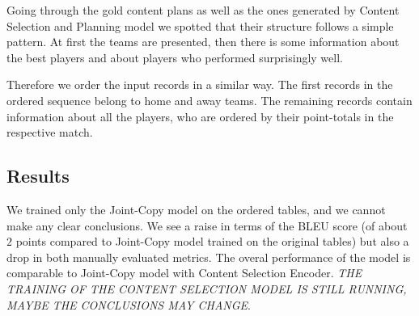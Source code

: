 Going through the gold content plans as well as the ones generated by Content Selection and Planning model we spotted that their structure follows a simple pattern. At first the teams are presented, then there is some information about the best players and about players who performed surprisingly well.

Therefore we order the input records in a similar way. The first records in the ordered sequence belong to home and away teams. The remaining records contain information about all the players, who are ordered by their point-totals in the respective match.

\subsection{Results}

We trained only the Joint-Copy model on the ordered tables, and we cannot make any clear conclusions. We see a raise in terms of the BLEU score (of about $2$ points compared to Joint-Copy model trained on the original tables) but also a drop in both manually evaluated metrics. The overal performance of the model is comparable to Joint-Copy model with Content Selection Encoder. \emph{THE TRAINING OF THE CONTENT SELECTION MODEL IS STILL RUNNING, MAYBE THE CONCLUSIONS MAY CHANGE}.

\begin{table}[h]
    \centering
    \caption{Performance metrics on the Content Selection and Planning model.} \label{table:metrics_copy_ordered}
\end{table}

